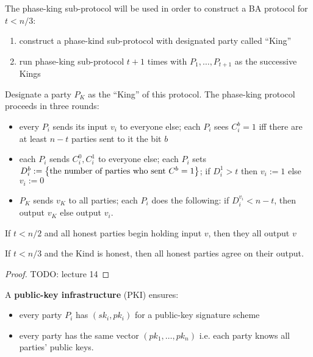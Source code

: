 The phase-king sub-protocol will be used in order to construct a BA protocol for $t < n/3$:
\begin{enumerate}
\item construct a phase-kind sub-protocol with designated party called ``King''
\item run phase-king sub-protocol $t + 1$ times with $P_1, \dots, P_{t+1}$ as the successive Kings
\end{enumerate}

\begin{prcl}
Designate a party $P_K$ as the ``King'' of this protocol.
The phase-king protocol proceeds in three rounds:
\begin{itemize}
\item 
every $P_i$ sends its input $v_i$ to everyone else;
each $P_i$ sees $C_i^b = 1$ iff there are at least $n - t$ parties sent to it the bit $b$
\item 
each $P_i$ sends $C_i^0, C_i^1$ to everyone else;
each $P_i$ sets $D_i^b := \left\{\text{the number of parties who sent}~C^b = 1\right\}$;
if $D_i^1 > t$ then $v_i := 1$ else $v_i := 0$
\item $P_K$ sends $v_K$ to all parties;
each $P_i$ does the following: if $D_i^{v_i} < n - t$, then output $v_K$ else output $v_i$.
\end{itemize}
\end{prcl}

\begin{lem}
If $t < n/2$ and all honest parties begin holding input $v$, then they all output $v$
\end{lem}

\begin{lem}
If $t < n/3$ and the Kind is honest, then all honest parties agree on their output.
\end{lem}

\begin{proof}
TODO: lecture 14
\end{proof}

\begin{defn}
A \textbf{public-key infrastructure} (PKI) ensures:
\begin{itemize}
\item every party $P_i$ has $(sk_i, pk_i)$ for a public-key signature scheme
\item every party has the same vector $(pk_1, \dots, pk_n)$ i.e. each party knows all parties' public keys.
\end{itemize}
\end{defn}

